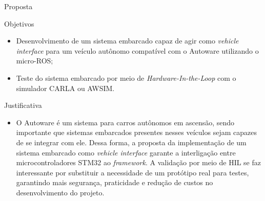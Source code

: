 \documentclass{if-beamer}
\begin{document}
\begin{frame}{Proposta}
	
	\begin{block}{Objetivos}
		
		\begin{itemize}
			\item Desenvolvimento de um sistema embarcado capaz de agir como \textit{vehicle interface} para um veículo autônomo compatível com o Autoware utilizando o micro-ROS;
			\item Teste do sistema embarcado por meio de \textit{Hardware-In-the-Loop} com o simulador CARLA ou AWSIM.
			
		\end{itemize}
		
	\end{block}
	
	\begin{block}{Justificativa}
	
	\begin{itemize}
		\item O Autoware é um sistema para carros autônomos em ascensão, sendo importante que sistemas embarcados presentes nesses veículos sejam capazes de se integrar com ele. Dessa forma, a proposta da implementação de um sistema embarcado como \textit{vehicle interface} garante a interligação entre microcontroladores STM32 ao \textit{framework}. A validação por meio de HIL se faz interessante por substituir a necessidade de um protótipo real para testes, garantindo mais segurança, praticidade e redução de custos no desenvolvimento do projeto.
		
	\end{itemize}
	
	\end{block}
	
\end{frame}
\end{document}
